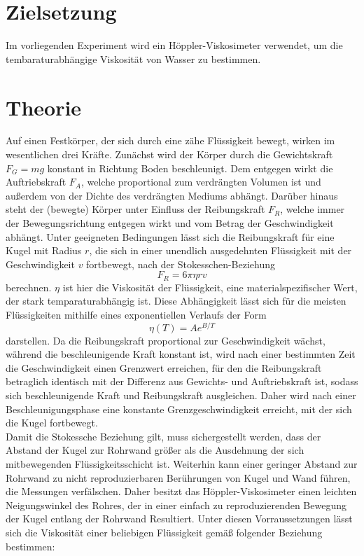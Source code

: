 \section{Zielsetzung}
\label{sec:zielsetzung}
Im vorliegenden Experiment wird ein Höppler-Viskosimeter verwendet, um die  tembaraturabhängige Viskosität von Wasser zu bestimmen.
\section{Theorie}
\label{sec:theorie}
Auf einen Festkörper, der sich durch eine zähe Flüssigkeit bewegt, wirken im wesentlichen drei Kräfte. Zunächst wird der Körper durch die Gewichtskraft $F_G=mg$ konstant in Richtung Boden beschleunigt. Dem entgegen wirkt die Auftriebskraft $F_A$, welche proportional zum verdrängten Volumen ist und außerdem von der Dichte des verdrängten Mediums abhängt. Darüber hinaus steht der (bewegte) Körper unter Einfluss der Reibungskraft $F_R$, welche immer der Bewegungsrichtung entgegen wirkt und vom Betrag der Geschwindigkeit abhängt. Unter geeigneten Bedingungen lässt sich die Reibungskraft für eine Kugel mit Radius $r$, die sich in einer unendlich ausgedehnten Flüssigkeit mit der Geschwindigkeit $v$ fortbewegt, nach der Stokesschen-Beziehung
\begin{equation}
F_R=6\pi \eta rv
\end{equation}
berechnen. $\eta$ ist hier die Viskosität der Flüssigkeit, eine materialspezifischer Wert, der stark temparaturabhängig ist. Diese Abhängigkeit lässt sich für die meisten Flüssigkeiten mithilfe eines exponentiellen Verlaufs der Form
\begin{equation}
    \label{eq:theoriekurve}
\eta (T) = Ae^{B/T}
\end{equation}
darstellen. Da die Reibungskraft proportional zur Geschwindigkeit wächst, während die beschleunigende Kraft konstant ist, wird nach einer bestimmten Zeit die Geschwindigkeit einen Grenzwert erreichen, für den die Reibungskraft betraglich identisch mit der Differenz aus Gewichts- und Auftriebskraft ist, sodass sich beschleunigende Kraft und Reibungskraft ausgleichen. Daher wird nach einer Beschleunigungsphase eine konstante Grenzgeschwindigkeit erreicht, mit der sich die Kugel fortbewegt. \\
Damit die Stokessche Beziehung gilt, muss sichergestellt werden, dass der Abstand der Kugel zur Rohrwand größer als die Ausdehnung der sich mitbewegenden Flüssigkeitsschicht ist. Weiterhin kann einer geringer Abstand zur Rohrwand zu nicht reproduzierbaren Berührungen von Kugel und Wand führen, die Messungen verfälschen. Daher besitzt das Höppler-Viskosimeter einen leichten Neigungswinkel des Rohres, der in einer einfach zu reproduzierenden Bewegung der Kugel entlang der Rohrwand Resultiert. Unter diesen Vorraussetzungen lässt sich die Viskosität einer beliebigen Flüssigkeit gemäß folgender Beziehung bestimmen:

